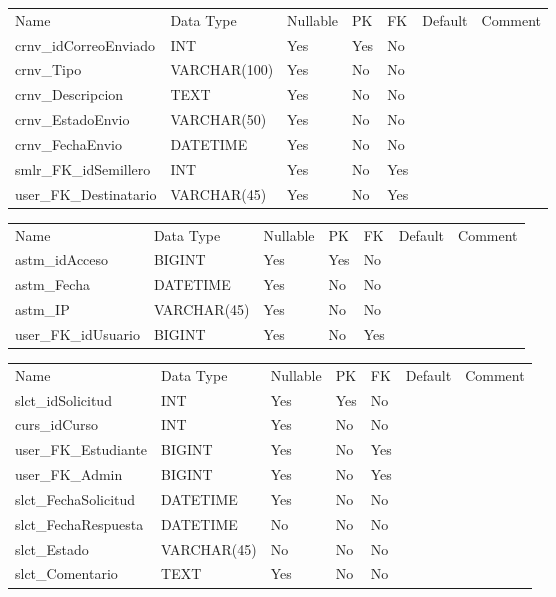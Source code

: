 			\begin{center}
				\begin{tabular}{ |l|l|l|l|l|l|l| }
					\hline
					Name & Data Type & Nullable & PK & FK & Default & Comment \\
					crnv_idCorreoEnviado & INT & Yes & Yes & No &  & \\ \hline 
crnv_Tipo & VARCHAR(100) & Yes & No & No &  & \\ \hline 
crnv_Descripcion & TEXT & Yes & No & No &  & \\ \hline 
crnv_EstadoEnvio & VARCHAR(50) & Yes & No & No &  & \\ \hline 
crnv_FechaEnvio & DATETIME & Yes & No & No &  & \\ \hline 
smlr_FK_idSemillero & INT & Yes & No & Yes &  & \\ \hline 
user_FK_Destinatario & VARCHAR(45) & Yes & No & Yes &  & \\ \hline 

				\end{tabular}
			\end{center}
		

			\begin{center}
				\begin{tabular}{ |l|l|l|l|l|l|l| }
					\hline
					Name & Data Type & Nullable & PK & FK & Default & Comment \\
					astm_idAcceso & BIGINT & Yes & Yes & No &  & \\ \hline 
astm_Fecha & DATETIME & Yes & No & No &  & \\ \hline 
astm_IP & VARCHAR(45) & Yes & No & No &  & \\ \hline 
user_FK_idUsuario & BIGINT & Yes & No & Yes &  & \\ \hline 

				\end{tabular}
			\end{center}
		

			\begin{center}
				\begin{tabular}{ |l|l|l|l|l|l|l| }
					\hline
					Name & Data Type & Nullable & PK & FK & Default & Comment \\
					slct_idSolicitud & INT & Yes & Yes & No &  & \\ \hline 
curs_idCurso & INT & Yes & No & No &  & \\ \hline 
user_FK_Estudiante & BIGINT & Yes & No & Yes &  & \\ \hline 
user_FK_Admin & BIGINT & Yes & No & Yes &  & \\ \hline 
slct_FechaSolicitud & DATETIME & Yes & No & No &  & \\ \hline 
slct_FechaRespuesta & DATETIME & No & No & No &  & \\ \hline 
slct_Estado & VARCHAR(45) & No & No & No &  & \\ \hline 
slct_Comentario & TEXT & Yes & No & No &  & \\ \hline 

				\end{tabular}
			\end{center}
		

